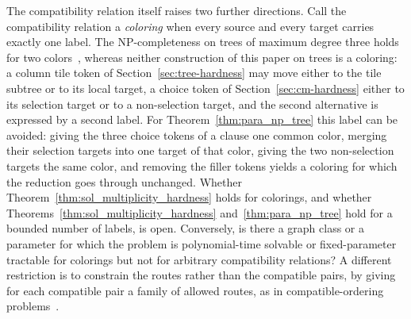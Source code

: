 \documentclass[a4paper,USenglish,thm-restate]{lipics-v2021}
\theoremstyle{problemstyle}
\begin{document}
The compatibility relation itself raises two further directions. Call
the compatibility relation a \emph{coloring} when every source and every
target carries exactly one label. The \textsf{NP}-completeness on trees
of maximum degree three holds for two colors~\cite{Geft2026Trees},
whereas neither construction of this paper on trees is a coloring: a
column tile token of Section~\ref{sec:tree-hardness} may move either to the tile
subtree or to its local target, a choice token of
Section~\ref{sec:cm-hardness} either to its selection target or to a
non-selection target, and the second alternative is expressed by a second
label. For Theorem~\ref{thm:para_np_tree} this label can be avoided:
giving the three choice tokens of a clause one common color, merging
their selection targets into one target of that color, giving the two
non-selection targets the same color, and removing the filler tokens
yields a coloring for which the reduction goes through unchanged.
Whether Theorem~\ref{thm:sol_multiplicity_hardness} holds for colorings,
and whether Theorems~\ref{thm:sol_multiplicity_hardness}
and~\ref{thm:para_np_tree} hold for a bounded number of labels, is open.
Conversely, is there a graph class or a parameter for which the problem
is polynomial-time solvable or fixed-parameter tractable for colorings
but not for arbitrary compatibility relations? A different restriction
is to constrain the routes rather than the compatible pairs, by giving
for each compatible pair a family of allowed routes, as in
compatible-ordering problems~\cite{DBLP:conf/sofsem/BousquetSMN26}.
 
\end{document}
